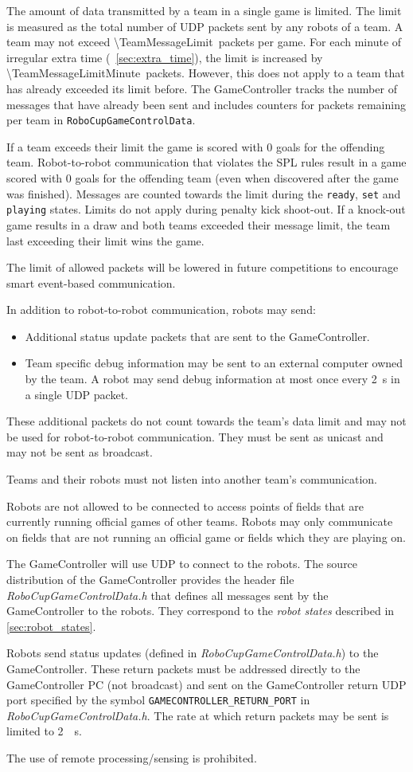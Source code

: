 The amount of data transmitted by a team in a single game is limited.
The limit is measured as the total number of UDP packets sent by any robots of a team.
A team may not exceed \qty{\TeamMessageLimit}{packets} per game.
For each minute of irregular extra time (\cf~\cref{sec:extra_time}), the limit is increased by \qty{\TeamMessageLimitMinute}{packets}.
However, this does not apply to a team that has already exceeded its limit before.
The GameController tracks the number of messages that have already been sent and includes counters for packets remaining per team in \texttt{RoboCupGameControlData}.

If a team exceeds their limit the game is scored with 0 goals for the offending team.
Robot-to-robot communication that violates the SPL rules result in a game scored with 0 goals for the offending team (even when discovered after the game was finished).
Messages are counted towards the limit during the \texttt{ready}, \texttt{set} and \texttt{playing} states.
Limits do not apply during penalty kick shoot-out.
If a knock-out game results in a draw and both teams exceeded their message limit, the team last exceeding their limit wins the game.

The limit of allowed packets will be lowered in future competitions to encourage smart event-based communication.

In addition to robot-to-robot communication, robots may send:
\begin{itemize}
 \item Additional status update packets that are sent to the GameController.
 \item Team specific debug information may be sent to an external computer owned by the team.
   A robot may send debug information at most once every \qty{2}{\second} in a single UDP packet.
\end{itemize}
These additional packets do not count towards the team's data limit and may not be used for robot-to-robot communication.
They must be sent as unicast and may not be sent as broadcast.

Teams and their robots must not listen into another team's communication.

Robots are not allowed to be connected to access points of fields that are currently running official games of other teams.
Robots may only communicate on fields that are not running an official game or fields which they are playing on.

The GameController will use UDP to connect to the robots.
The source distribution of the GameController provides the header file \emph{RoboCupGameControlData.h} that defines all messages sent by the GameController to the robots.
They correspond to the \emph{robot states} described in \cref{sec:robot_states}.

Robots send status updates (defined in \emph{RoboCupGameControlData.h}) to the GameController.
These return packets must be addressed directly to the GameController PC (\ie not broadcast) and sent on the GameController return UDP port specified by the symbol \verb!GAMECONTROLLER_RETURN_PORT! in \emph{RoboCupGameControlData.h}.
The rate at which return packets may be sent is limited to \qty{2}{\per\second}.

The use of remote processing/sensing is prohibited.
